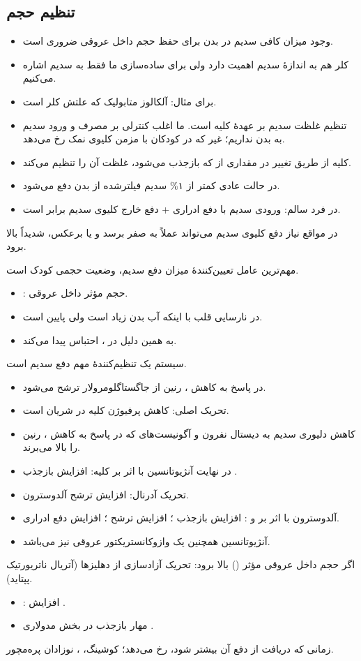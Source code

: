 \documentclass[12pt,a4paper]{article}
\begin{document}
\subsection*{تنظیم حجم}
\begin{itemize}
\item وجود میزان کافی سدیم در بدن برای حفظ حجم داخل عروقی ضروری است.
\item کلر هم به اندازهٔ سدیم اهمیت دارد ولی برای ساده‌سازی ما فقط به سدیم اشاره می‌کنیم.
\item برای مثال: آلکالوز متابولیک  که علتش کلر است.
\item تنظیم غلظت سدیم بر عهدهٔ کلیه است. ما اغلب کنترلی بر مصرف و ورود سدیم به بدن نداریم؛ غیر  که در کودکان با  مزمن کلیوی نمک رخ می‌دهد.
\item کلیه از طریق تغییر در مقداری از  که بازجذب می‌شود، غلظت آن را تنظیم می‌کند.
\item در حالت عادی کمتر از ۱\% سدیم فیلترشده از بدن دفع می‌شود.
\item در فرد سالم: ورودی سدیم با دفع ادراری + دفع خارج کلیوی سدیم برابر است.
\end{itemize}

در مواقع نیاز دفع کلیوی سدیم می‌تواند عملاً به صفر برسد و یا برعکس، شدیداً بالا برود.

مهم‌ترین عامل تعیین‌کنندهٔ میزان دفع سدیم، وضعیت حجمی کودک است.
\begin{itemize}
\item {}: حجم مؤثر داخل عروقی.
\item در نارسایی قلب با اینکه آب بدن زیاد است ولی  پایین است.
\item به همین دلیل در ،  احتباس پیدا می‌کند.
\end{itemize}
سیستم  یک تنظیم‌کنندهٔ مهم دفع سدیم است.
\begin{itemize}
\item در پاسخ به کاهش ، رنین از جاگستاگلومرولار ترشح می‌شود.
\item تحریک اصلی: کاهش پرفیوژن کلیه در شریان  است.
\item کاهش دلیوری سدیم به دیستال نفرون و آگونیست‌های  که در پاسخ به کاهش ، رنین را بالا می‌برند.
\item در نهایت آنژیوتانسین  با اثر بر  کلیه: افزایش بازجذب .
\item تحریک آدرنال: افزایش ترشح آلدوسترون.
\item آلدوسترون با اثر بر  و : افزایش بازجذب ؛ افزایش ترشح ؛ افزایش دفع ادراری.
\item آنژیوتانسین  همچنین یک وازوکانستریکتور عروقی نیز می‌باشد.
\end{itemize}
اگر حجم داخل عروقی مؤثر () بالا برود: تحریک آزادسازی  از دهلیزها (آتریال ناتریورتیک پپتاید).
\begin{itemize}
\item {}: افزایش .
\item مهار بازجذب  در بخش مدولاری .
\end{itemize}
زمانی که دریافت  از دفع آن بیشتر شود،  رخ می‌دهد؛ کوشینگ، ، نوزادان پره‌مچور.
\end{document}
